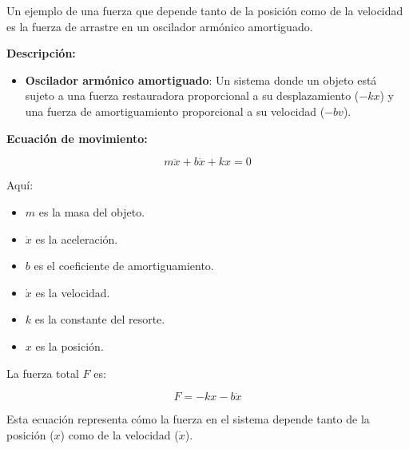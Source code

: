 \documentclass{article}
\begin{document}
Un ejemplo de una fuerza que depende tanto de la posición como de la velocidad es la fuerza de arrastre en un oscilador armónico amortiguado.

\textbf{Descripción:}

\begin{itemize}
    \item \textbf{Oscilador armónico amortiguado}: Un sistema donde un objeto está sujeto a una fuerza restauradora proporcional a su desplazamiento ($ -kx $) y una fuerza de amortiguamiento proporcional a su velocidad ($ -bv $).
\end{itemize}

\textbf{Ecuación de movimiento:}

\[ m \ddot{x} + b \dot{x} + kx = 0 \]

Aquí:
\begin{itemize}
    \item $ m $ es la masa del objeto.
    \item $ \ddot{x} $ es la aceleración.
    \item $ b $ es el coeficiente de amortiguamiento.
    \item $ \dot{x} $ es la velocidad.
    \item $ k $ es la constante del resorte.
    \item $ x $ es la posición.
\end{itemize}

La fuerza total $ F $ es:

\[ F = -kx - b \dot{x} \]

Esta ecuación representa cómo la fuerza en el sistema depende tanto de la posición ($ x $) como de la velocidad ($ \dot{x} $).
\end{document}
